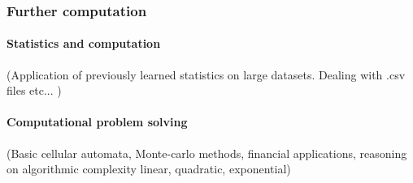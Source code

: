 \documentclass[12pt]{report}
\begin{document}
    \subsubsection{Further computation} 
        \paragraph*{Statistics and computation} (Application of previously learned statistics on large datasets. Dealing with .csv files etc... )
        \paragraph*{Computational problem solving} (Basic cellular automata, Monte-carlo methods, financial applications, reasoning on algorithmic complexity linear, quadratic, exponential)
\end{document}
